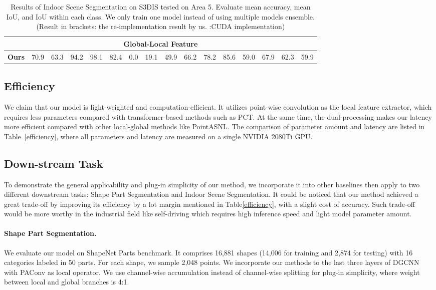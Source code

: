 \documentclass[sigconf]{acmart}
\begin{document}
\begin{table*}[t]
\begin{adjustbox}{width=\textwidth}
\begin{tabular}{l|cc|ccccccccccccc}
		\midrule
	    \multicolumn{16}{c}{Global-Local Feature} \\ \midrule \textbf{Ours}  &70.9 &63.3 &94.2 &98.1 &82.4 &0.0 &19.1 &49.9 &66.2 &78.2 &85.6 &59.0 &67.9 &62.3 &59.9 \\
	\bottomrule
	\end{tabular}
\end{adjustbox}
\caption{Results of Indoor Scene Segmentation on S3DIS\cite{armeni20163d} tested on Area 5. Evaluate mean accuracy, mean IoU, and IoU within each class. We only train one model instead of using multiple models ensemble.(Result in brackets: the re-implementation result by us.
:CUDA implementation)}
\vspace*{-0.5cm}
\label{s3dis}
\end{table*}


\subsection{Efficiency}
We claim that our model is light-weighted and computation-efficient. It utilizes point-wise convolution as the local feature extractor, which requires less parameters compared with transformer-based methods such as PCT\cite{guo2021pct}.  At the same time, the dual-processing makes our latency more efficient compared with other local-global methods like PointASNL\cite{yan2020pointasnl}. The comparison of parameter amount and latency are listed in Table~\ref{efficiency}, where all parameters and latency are measured on a single NVIDIA 2080Ti GPU.







\subsection{Down-stream Task}
To demonstrate the general applicability and plug-in simplicity of our method, we incorporate it into other baselines then apply to two different downstream tasks: Shape Part Segmentation and Indoor Scene Segmentation. It could be noticed that our method achieved a great trade-off by improving its efficiency by a lot margin mentioned in Table\ref{efficiency}, with a slight cost of accuracy. Such trade-off would be more worthy in the industrial field like self-driving which requires high inference speed and light model parameter amount.
\paragraph{Shape Part Segmentation.}
We evaluate our model on ShapeNet Parts\cite{wu20143d} benchmark. It comprises 16,881 shapes (14,006 for training and 2,874 for testing) with 16 categories labeled in 50 parts. For each shape, we sample 2,048 points. We incorporate our methods to the last three layers of DGCNN\cite{wang2019dynamic} with PAConv\cite{xu2021paconv} as local operator. We use channel-wise accumulation instead of channel-wise splitting for plug-in simplicity, where weight between local and global branches is 4:1. 
\end{document}
